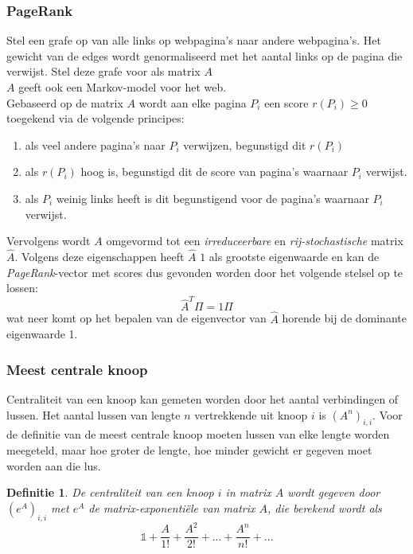 \documentclass{article}
\newtheorem{mydef}{Definitie}
\begin{document}
	\subsubsection{PageRank}
	
	Stel een grafe op van alle links op webpagina's naar andere webpagina's. Het gewicht van de edges wordt genormaliseerd met het aantal links op de pagina die verwijst. Stel deze grafe voor als matrix $A$\\
	
	$A$ geeft ook een Markov-model voor het web.\\
	
	Gebaseerd op de matrix $A$ wordt aan elke pagina $P_i$ een score $r(P_i) \geq 0$ toegekend via de volgende principes:
	\begin{enumerate}
		\item als veel andere pagina's naar $P_i$ verwijzen, begunstigd dit $r(P_i)$
		\item als $r(P_i)$ hoog is, begunstigd dit de score van pagina's waarnaar $P_i$ verwijst.
		\item als $P_i$ weinig links heeft is dit begunstigend voor de pagina's waarnaar $P_i$ verwijst.
	\end{enumerate}

	Vervolgens wordt $A$ omgevormd tot een \textit{irreduceerbare} en \textit{rij-stochastische} matrix $\hat{A}$. Volgens deze eigenschappen heeft $\hat{A}$ $1$ als grootste eigenwaarde en kan de \textit{PageRank}-vector met scores dus gevonden worden door het volgende stelsel op te lossen:
	$$ \hat{A}^T \Pi = 1 \Pi $$
	wat neer komt op het bepalen van de eigenvector van $\hat{A}$ horende bij de dominante eigenwaarde 1.
	
	\subsubsection{Meest centrale knoop}
	
	Centraliteit van een knoop kan gemeten worden door het aantal verbindingen of lussen. Het aantal lussen van lengte $n$ vertrekkende uit knoop $i$ is $(A^n)_{i,i}$. Voor de definitie van de meest centrale knoop moeten lussen van elke lengte worden meegeteld, maar hoe groter de lengte, hoe minder gewicht er gegeven moet worden aan die lus.\\
	
	\begin{mydef}
		
		De centraliteit van een knoop $i$ in matrix $A$ wordt gegeven door $(e^A)_{i,i}$ met $e^A$ de matrix-exponentiële van matrix $A$, die berekend wordt als
		$$
		\mathbb{1} + \frac{A}{1!} + \frac{A^2}{2!} + ... + \frac{A^n}{n!} + ...
		$$
	\end{mydef}
	
\end{document}
